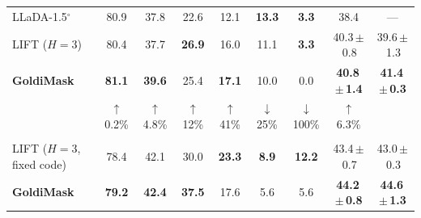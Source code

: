 \documentclass{article} %
\begin{document}
\begin{table}[t]
\begin{center}
{\begin{tabular}{lcccccccc}
LLaDA-1.5$^\circ$ & 80.9 & 37.8 & 22.6 & 12.1 & \textbf{13.3} & \textbf{3.3} & 38.4 & --- \\
LIFT ($H{=}3$) & 80.4 & 37.7 & \textbf{26.9} & 16.0 & 11.1 & \textbf{3.3} & 40.3\,$\pm$\,0.8 & 39.6\,$\pm$\,1.3 \\
\rowcolor{goldrow}\textbf{GoldiMask} & \textbf{81.1} & \textbf{39.6} & 25.4 & \textbf{17.1} & 10.0 & 0.0 & \textbf{40.8\,$\pm$\,1.4} & \textbf{41.4\,$\pm$\,0.3} \\
\rowcolor{goldrow} & {\scriptsize\color{gray}$\uparrow$0.2\%} & {\scriptsize\color{gray}$\uparrow$4.8\%} & {\scriptsize\color{gray}$\uparrow$12\%} & {\scriptsize\color{gray}$\uparrow$41\%} & {\scriptsize\color{gray}$\downarrow$25\%} & {\scriptsize\color{gray}$\downarrow$100\%} & {\scriptsize\color{gray}$\uparrow$6.3\%} & \\
\midrule
\rowcolor{panelrow}\multicolumn{9}{l}{\emph{Dream-7B}}\\
LIFT ($H{=}3$, fixed code) & 78.4 & 42.1 & 30.0 & \textbf{23.3} & \textbf{8.9} & \textbf{12.2} & 43.4\,$\pm$\,0.7 & 43.0\,$\pm$\,0.3 \\
\rowcolor{goldrow}\textbf{GoldiMask} & \textbf{79.2} & \textbf{42.4} & \textbf{37.5} & 17.6 & 5.6 & 5.6 & \textbf{44.2\,$\pm$\,0.8} & \textbf{44.6\,$\pm$\,1.3} \\
\bottomrule
\end{tabular}}
\end{center}
\end{table}
\end{document}
